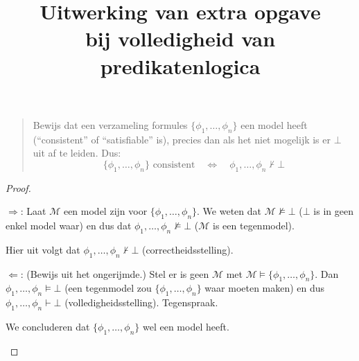 \documentclass[a4paper,11pt]{article}
\title{Uitwerking van extra opgave\\
\normalsize{bij volledigheid van predikatenlogica}}
\date{}
\begin{document}
\maketitle


\begin{quote}
  Bewijs dat een verzameling formules $\{\phi_{1}, \ldots, \phi_{n}\}$ een model
  heeft (``consistent'' of ``satisfiable'' is), precies dan als het niet
  mogelijk is er $\bot$ uit af te leiden. Dus:
  \begin{equation*}
    \{\phi_{1}, \ldots, \phi_{n}\} \text{ consistent}
    \quad \Leftrightarrow \quad
    \phi_{1}, \ldots, \phi_{n} \not \vdash \bot
  \end{equation*}
\end{quote}

\begin{proof}

\begin{description}

\item{$\Rightarrow$:} Laat $\mathcal{M}$ een model zijn voor
$\{\phi_{1}, \ldots, \phi_{n}\}$. We weten dat $\mathcal{M} \not \models \bot$
($\bot$ is in geen enkel model waar) en dus dat
$\phi_{1}, \ldots, \phi_{n} \not \models \bot$ ($\mathcal{M}$ is een
tegenmodel).

Hier uit volgt dat
$\phi_{1}, \ldots, \phi_{n} \not \vdash \bot$ (correctheidsstelling).

\item{$\Leftarrow$:} (Bewijs uit het ongerijmde.) Stel er is geen $\mathcal{M}$
met $\mathcal{M} \models \{\phi_{1}, \ldots, \phi_{n}\}$. Dan
\mbox{$\phi_{1}, \ldots, \phi_{n} \models \bot$} (een tegenmodel zou
$\{\phi_{1}, \ldots, \phi_{n}\}$ waar moeten maken) en dus
$\phi_{1}, \ldots, \phi_{n} \vdash \bot$ (volledigheidsstelling).
Tegenspraak.

We concluderen dat $\{\phi_{1}, \ldots, \phi_{n}\}$ wel een model heeft.

\end{description}

\end{proof}
\end{document}

